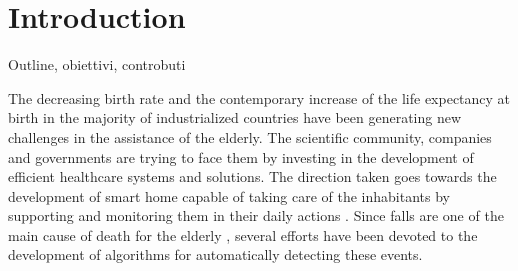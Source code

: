 \chapter{Introduction}\label{ch:intro}

Outline, obiettivi, controbuti

The decreasing birth rate \cite{eurostat} and the contemporary increase of the life expectancy at birth \cite{Carone2006} in the majority of industrialized countries have been generating new challenges in the assistance of the elderly. The scientific community, companies and governments are trying to face them by investing in the development of efficient healthcare systems and solutions. The direction taken goes towards the development of smart home capable of taking care of the inhabitants by supporting and monitoring them in their daily actions \cite{Dawadi20161188, Principi2015a}. Since falls are one of the main cause of death for the elderly \cite{mubashir2013survey}, several efforts have been devoted to the development of algorithms for automatically detecting these events.





